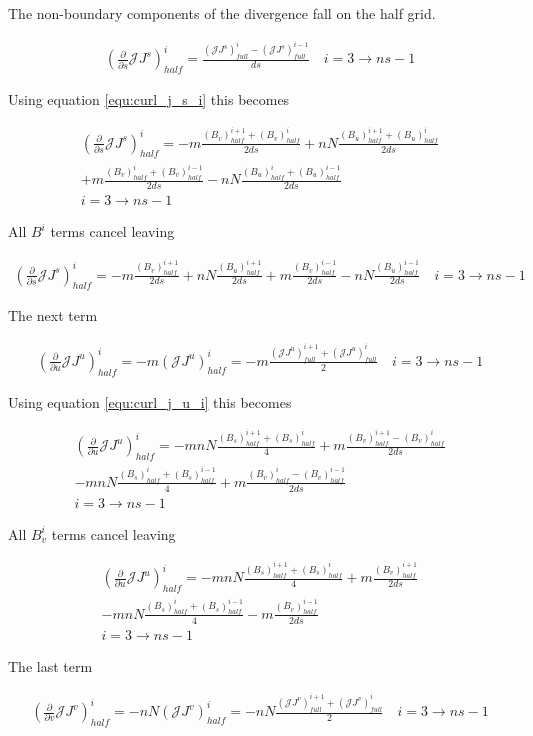 \documentclass[11pt]{article}
\newcommand{\brackets}[1]{\left(#1\right)}
\newcommand{\equ}[2]{
	\begin{equation}
    \begin{split}
	#1
	\label{#2}
	\end{split}
	\end{equation}
}
\begin{document}
The non-boundary components of the divergence fall on the half grid.
\equ{
\brackets{\frac{\partial}{\partial s}\mathcal{J}J^{s}}^{i}_{half}=\frac{\brackets{\mathcal{J}J^{s}}^{i}_{full}-\brackets{\mathcal{J}J^{s}}^{i-1}_{full}}{ds}\quad i=3\rightarrow ns-1
}{equ:div_jj_s}
Using equation \ref{equ:curl_j_s_i} this becomes
\equ{
\brackets{\frac{\partial}{\partial s}\mathcal{J}J^{s}}^{i}_{half}=-m\frac{\brackets{B_{v}}^{i+1}_{half}+\brackets{B_{v}}^{i}_{half}}{2ds}+nN\frac{\brackets{B_{u}}^{i+1}_{half}+\brackets{B_{u}}^{i}_{half}}{2ds}\\
+m\frac{\brackets{B_{v}}^{i}_{half}+\brackets{B_{v}}^{i-1}_{half}}{2ds}-nN\frac{\brackets{B_{u}}^{i}_{half}+\brackets{B_{u}}^{i-1}_{half}}{2ds}\\i=3\rightarrow ns-1
}{equ:div_jj_s_1}
All $B^{i}$ terms cancel leaving
\equ{
\brackets{\frac{\partial}{\partial s}\mathcal{J}J^{s}}^{i}_{half}=-m\frac{\brackets{B_{v}}^{i+1}_{half}}{2ds}+nN\frac{\brackets{B_{u}}^{i+1}_{half}}{2ds}+m\frac{\brackets{B_{v}}^{i-1}_{half}}{2ds}-nN\frac{\brackets{B_{u}}^{i-1}_{half}}{2ds}\quad i=3\rightarrow ns-1
}{equ:div_jj_s_2}
The next term
\equ{
\brackets{\frac{\partial}{\partial u}\mathcal{J}J^{u}}^{i}_{half}=-m\brackets{\mathcal{J}J^{u}}^{i}_{half}=
-m\frac{\brackets{\mathcal{J}J^{u}}^{i+1}_{full} + \brackets{\mathcal{J}J^{u}}^{i}_{full}}{2}\quad i=3\rightarrow ns-1
}{equ:div_jj_u}
Using equation \ref{equ:curl_j_u_i} this becomes
\equ{
\brackets{\frac{\partial}{\partial u}\mathcal{J}J^{u}}^{i}_{half}=-mnN\frac{\brackets{B_{s}}^{i+1}_{half}+\brackets{B_{s}}^{i}_{half}}{4}+m\frac{\brackets{B_{v}}^{i+1}_{half}-\brackets{B_{v}}^{i}_{half}}{2ds}\\
-mnN\frac{\brackets{B_{s}}^{i}_{half}+\brackets{B_{s}}^{i-1}_{half}}{4}+m\frac{\brackets{B_{v}}^{i}_{half}-\brackets{B_{v}}^{i-1}_{half}}{2ds}\\
i=3\rightarrow ns-1
}{equ:div_jj_u_1}
All $B^{i}_{v}$ terms cancel leaving
\equ{
\brackets{\frac{\partial}{\partial u}\mathcal{J}J^{u}}^{i}_{half}=-mnN\frac{\brackets{B_{s}}^{i+1}_{half}+\brackets{B_{s}}^{i}_{half}}{4}+m\frac{\brackets{B_{v}}^{i+1}_{half}}{2ds}\\
-mnN\frac{\brackets{B_{s}}^{i}_{half}+\brackets{B_{s}}^{i-1}_{half}}{4}-m\frac{\brackets{B_{v}}^{i-1}_{half}}{2ds}\\
i=3\rightarrow ns-1
}{equ:div_jj_u_2}
The last term
\equ{
\brackets{\frac{\partial}{\partial v}\mathcal{J}J^{v}}^{i}_{half}=-nN\brackets{\mathcal{J}J^{v}}^{i}_{half}=
-nN\frac{\brackets{\mathcal{J}J^{v}}^{i+1}_{full} + \brackets{\mathcal{J}J^{v}}^{i}_{full}}{2}\quad i=3\rightarrow ns-1
}{equ:div_jj_v}
\end{document}
